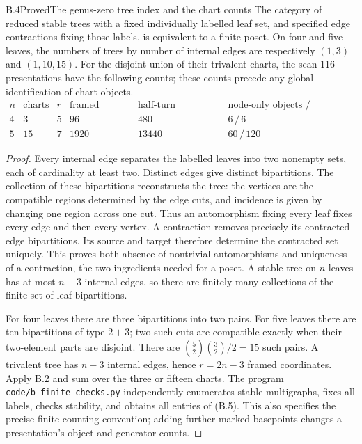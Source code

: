 \begin{result}{B.4}{Proved}{The genus-zero tree index and the chart counts}
The category of reduced stable trees with a fixed individually
labelled leaf set, and specified edge contractions fixing those
labels, is equivalent to a finite poset.  On four and five leaves,
the numbers of trees by number of internal edges are respectively
$(1,3)$ and $(1,10,15)$.  For the disjoint union of their trivalent
charts, the scan 116 presentations have the following counts;
these counts precede any global identification of chart objects.
\[
\begin{array}{c|r|r|r|r|r}
 n&\text{charts}&r&\text{framed objects}&\text{half-turn generators}
       &\text{node-only objects / generators}\\\hline
 4&3&5&96&480&6\,/\,6\\
 5&15&7&1920&13440&60\,/\,120
\end{array}
\tag{B.5}
\]
\end{result}
\begin{proof}
Every internal edge separates the labelled leaves into two nonempty
sets, each of cardinality at least two.  Distinct edges give distinct
bipartitions.  The collection of these bipartitions reconstructs the
tree: the vertices are the compatible regions determined by the
edge cuts, and incidence is given by changing one region across one
cut.  Thus an automorphism fixing every leaf fixes every edge and
then every vertex.  A contraction removes precisely its contracted
edge bipartitions.  Its source and target therefore determine the
contracted set uniquely.  This proves both absence of nontrivial
automorphisms and uniqueness of a contraction, the two ingredients
needed for a poset.  A stable tree on $n$ leaves has at most $n-3$
internal edges, so there are finitely many collections of the finite
set of leaf bipartitions.

For four leaves there are three bipartitions into two pairs.  For
five leaves there are ten bipartitions of type $2+3$; two such cuts
are compatible exactly when their two-element parts are disjoint.
There are $\binom52\binom32/2=15$ such pairs.  A trivalent tree has
$n-3$ internal edges, hence $r=2n-3$ framed coordinates.  Apply B.2
and sum over the three or fifteen charts.  The program
\texttt{code/b\_finite\_checks.py} independently enumerates stable
multigraphs, fixes all labels, checks stability, and obtains all
entries of (B.5).  This also specifies the precise finite counting
convention; adding further marked basepoints changes a presentation's
object and generator counts.
\end{proof}

